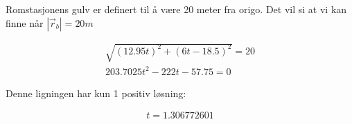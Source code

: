 \subsubsection{}

Romstasjonens gulv er definert til å være 20 meter fra origo. Det vil si at vi kan finne når $|\vec{r}_b| = 20m$

\begin{align}
\sqrt{(12.95 t)^2 + (6 t - 18.5)^2} = 20 \\[1em]
203.7025 t^2 - 222 t - 57.75 = 0
\end{align}

Denne ligningen har kun 1 positiv løsning:

\begin{align}
t = 1.306772601
\end{align}

\begin{figure}[H]
\centering

\caption{}
\end{figure}

\newpage




\newpage